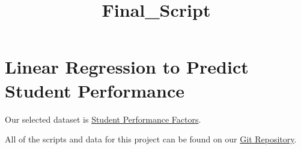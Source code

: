\documentclass[11pt]{article}
\title{Final\_Script}
\begin{document}
    
    \maketitle
    
    

    
    \section{Linear Regression to Predict Student
Performance}\label{linear-regression-to-predict-student-performance}

    Our selected dataset is
\href{https://www.kaggle.com/datasets/lainguyn123/student-performance-factors}{Student
Performance Factors}.

All of the scripts and data for this project can be found on our
\href{https://github.com/cztm/linear-regression}{Git Repository}.
\end{document}
